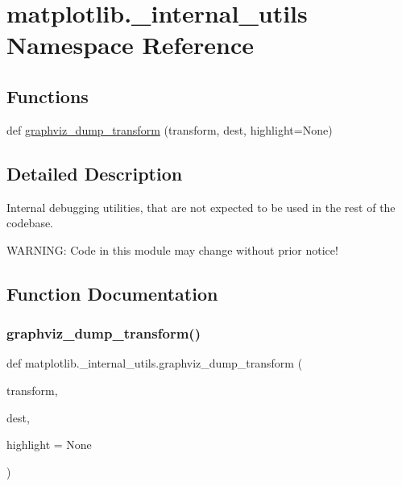 \hypertarget{namespacematplotlib_1_1__internal__utils}{}\section{matplotlib.\+\_\+internal\+\_\+utils Namespace Reference}
\label{namespacematplotlib_1_1__internal__utils}
\subsection*{Functions}
\begin{DoxyCompactItemize}
\item 
def \hyperlink{namespacematplotlib_1_1__internal__utils_a49104ef82837af8e99081a3c428cdf0a}{graphviz\+\_\+dump\+\_\+transform} (transform, dest, highlight=None)
\end{DoxyCompactItemize}


\subsection{Detailed Description}
\begin{DoxyVerb}Internal debugging utilities, that are not expected to be used in the rest of
the codebase.

WARNING: Code in this module may change without prior notice!
\end{DoxyVerb}
 

\subsection{Function Documentation}
\mbox{\label{namespacematplotlib_1_1__internal__utils_a49104ef82837af8e99081a3c428cdf0a}} 
\subsubsection{\texorpdfstring{graphviz\+\_\+dump\+\_\+transform()}{graphviz\_dump\_transform()}}
{\footnotesize\ttfamily def matplotlib.\+\_\+internal\+\_\+utils.\+graphviz\+\_\+dump\+\_\+transform (\begin{DoxyParamCaption}\item[{}]{transform,  }\item[{}]{dest,  }\item[{}]{highlight = {\ttfamily None} }\end{DoxyParamCaption})}


